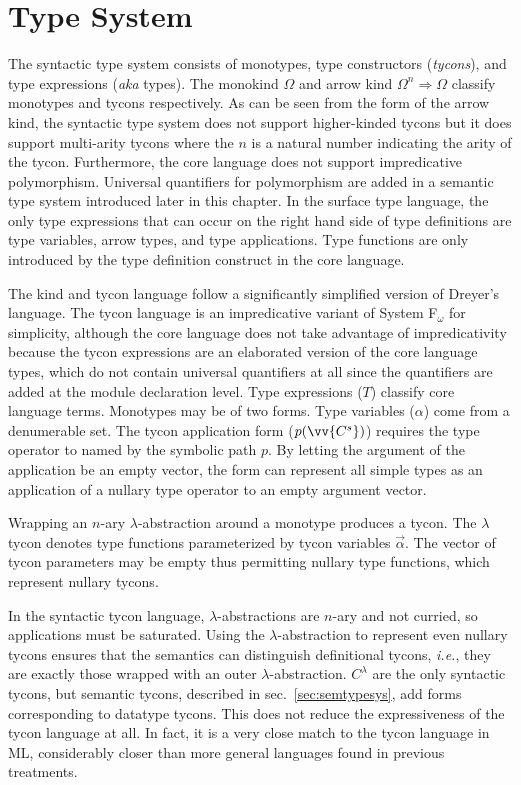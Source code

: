 
\chapter{Type System}\label{ch:typesystem}



The syntactic type system consists of monotypes, type constructors (\emph{tycons}), and type expressions (\emph{aka} types). The monokind $\Omega$ and arrow kind $\Omega^n \Rightarrow \Omega$ classify monotypes and tycons respectively. As can be seen from the form of the arrow kind, the syntactic type system does not support higher-kinded tycons but it does support multi-arity tycons where the $n$ is a natural number indicating the arity of the tycon. Furthermore, the core language does not support impredicative polymorphism. Universal quantifiers for polymorphism are added in a semantic type system introduced later in this chapter. In the surface type language, the only type expressions that can occur on the right hand side of type definitions are type variables, arrow types, and type applications. Type functions are only introduced by the type definition construct in the core language. 

The kind and tycon language follow a significantly simplified version of Dreyer's language\cite{dreyerthesis}. The tycon language is an impredicative variant of System F$_\omega$ for simplicity, although the core language does not take advantage of impredicativity because the tycon expressions are an elaborated version of the core language types, which do not contain universal quantifiers at all since the quantifiers are added at the module declaration level. Type expressions ($T$) classify core language terms.  Monotypes may be of two forms. Type variables ($\alpha$) come from a denumerable set. The tycon application form ($p(\vv{C^s})$) requires the type operator to named by the symbolic path $p$. By letting the argument of the application be an empty vector, the form can represent all simple types as an application of a nullary type operator to an empty argument vector. 

Wrapping an $n$-ary $\lambda$-abstraction around a monotype produces a tycon. 
The $\lambda$ tycon denotes type functions parameterized by tycon variables $\vec{\alpha}$. The vector of tycon parameters may be empty thus permitting nullary type functions, which represent nullary tycons. 

In the syntactic tycon language, $\lambda$-abstractions are $n$-ary and not curried, so applications must be saturated. Using the $\lambda$-abstraction to represent even nullary tycons ensures that the semantics can distinguish definitional tycons, \emph{i.e.}, they are exactly those wrapped with an outer $\lambda$-abstraction. $C^\lambda$ are the only syntactic tycons, but semantic tycons, described in sec.~\ref{sec:semtypesys}, add forms corresponding to datatype tycons. This does not reduce the expressiveness of the tycon language at all. In fact, it is a very close match to the tycon language in ML, considerably closer than more general languages found in previous treatments. 

